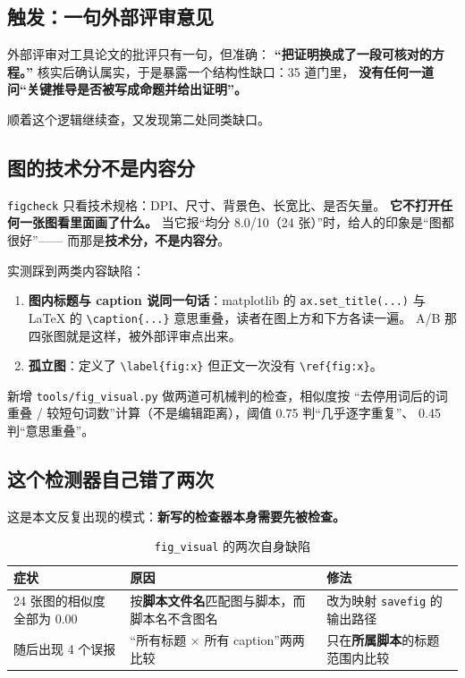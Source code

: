 \documentclass[11pt,a4paper]{article}
\newcommand{\code}[1]{\texttt{#1}}
\begin{document}
\subsection{触发：一句外部评审意见}
外部评审对工具论文的批评只有一句，但准确：
\textbf{“把证明换成了一段可核对的方程。”}
核实后确认属实，于是暴露一个结构性缺口：35 道门里，
\textbf{没有任何一道问“关键推导是否被写成命题并给出证明”。}

顺着这个逻辑继续查，又发现第二处同类缺口。

\subsection{图的技术分不是内容分}
\code{figcheck} 只看技术规格：DPI、尺寸、背景色、长宽比、是否矢量。
\textbf{它不打开任何一张图看里面画了什么。}
当它报“均分 8.0/10（24 张）”时，给人的印象是“图都很好”——
而那是\textbf{技术分，不是内容分}。

实测踩到两类内容缺陷：
\begin{enumerate}[leftmargin=1.6em,itemsep=2pt]
\item \textbf{图内标题与 caption 说同一句话}：matplotlib 的 \code{ax.set\_title(...)}
  与 \LaTeX{} 的 \code{\textbackslash caption\{...\}} 意思重叠，读者在图上方和下方各读一遍。
  A/B 那四张图就是这样，被外部评审点出来。
\item \textbf{孤立图}：定义了 \code{\textbackslash label\{fig:x\}} 但正文一次没有 \code{\textbackslash ref\{fig:x\}}。
\end{enumerate}

新增 \code{tools/fig\_visual.py} 做两道可机械判的检查，相似度按
“去停用词后的词重叠 / 较短句词数”计算（不是编辑距离），阈值 0.75 判“几乎逐字重复”、
0.45 判“意思重叠”。

\subsection{这个检测器自己错了两次}
这是本文反复出现的模式：\textbf{新写的检查器本身需要先被检查。}

\begin{table}[tbp]\centering\small
\caption{\code{fig\_visual} 的两次自身缺陷}\label{tab:figbug}
\setlength{\tabcolsep}{4pt}
\begin{tabular}{p{5.2cm}p{4.2cm}p{4.2cm}}
\toprule
症状 & 原因 & 修法\\
\midrule
24 张图的相似度全部为 0.00 & 按\textbf{脚本文件名}匹配图与脚本，而脚本名不含图名 & 改为映射 \code{savefig} 的输出路径\\
随后出现 4 个误报 & “所有标题 $\times$ 所有 caption”两两比较 & 只在\textbf{所属脚本}的标题范围内比较\\
\bottomrule
\end{tabular}
\end{table}
\end{document}
